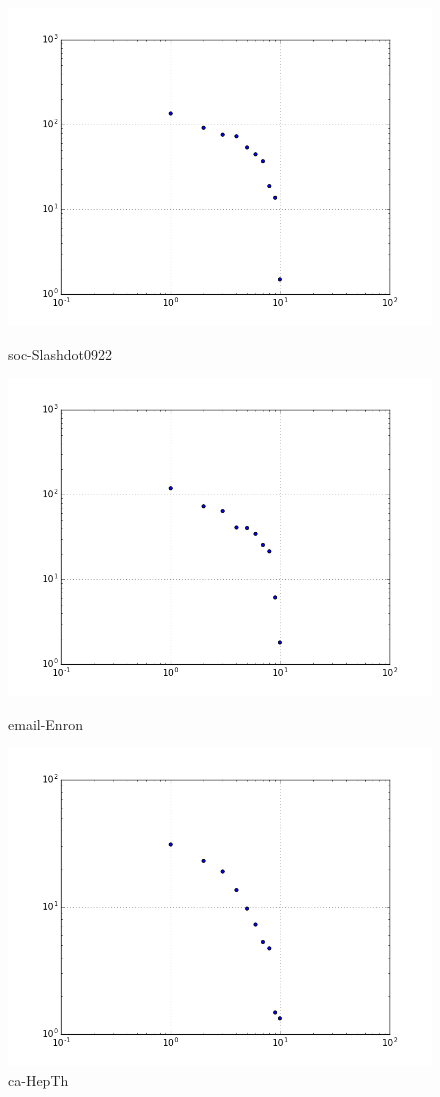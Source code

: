 \begin{figure}[H]
  \includegraphics[width=\linewidth]{img/slashDot09/eig.png}
  \caption*{soc-Slashdot0922}
\endminipage\hfill
{}
  \includegraphics[width=\linewidth]{img/email/eig.png}
  \caption*{email-Enron}
\endminipage\hfill
{}
  \includegraphics[width=\linewidth]{img/ca-HepTh/eig.png}
  \caption*{ca-HepTh}
\endminipage
\end{figure}
